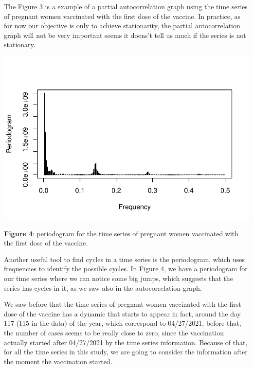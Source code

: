 \documentclass[
]{article}
\newenvironment{Shaded}{\begin{snugshade}}{\end{snugshade}}
\newcommand{\AttributeTok}[1]{\textcolor[rgb]{0.13,0.29,0.53}{#1}}
\newcommand{\FunctionTok}[1]{\textcolor[rgb]{0.13,0.29,0.53}{\textbf{#1}}}
\newcommand{\NormalTok}[1]{#1}
\newcommand{\SpecialCharTok}[1]{\textcolor[rgb]{0.81,0.36,0.00}{\textbf{#1}}}
\newcommand{\StringTok}[1]{\textcolor[rgb]{0.31,0.60,0.02}{#1}}
\renewenvironment{Shaded}{\begin{mdframed}[ backgroundcolor=shadecolor, linecolor = shadecolor, leftmargin=\dimexpr\leftmargin-2pt\relax, innerleftmargin=1.6pt, innertopmargin=5pt, skipabove=10pt,skipbelow=3pt ]}{\end{mdframed}}
\begin{document}
The Figure 3 is a example of a partial autocorrelation graph using the
time series of pregnant women vaccinated with the first dose of the
vaccine. In practice, as for now our objective is only to achieve
stationarity, the partial autocorrelation graph will not be very
important seems it doens't tell us much if the series is not stationary.

\begin{Shaded}
\end{Shaded}

\begin{center}\includegraphics[width=\linewidth]{IF_results_ENG_files/figure-latex/unnamed-chunk-4-1} \end{center}

\textbf{Figure 4}: periodogram for the time series of pregnant women
vaccinated with the first dose of the vaccine.

Another useful tool to find cycles in a time series is the periodogram,
which uses frequencies to identify the possible cycles. In Figure 4, we
have a periodogram for our time series where we can notice some big
jumps, which suggests that the series has cycles in it, as we saw also
in the autocorrelation graph.

We saw before that the time series of pregnant women vaccinated with the
first dose of the vaccine has a dynamic that starts to appear in fact,
around the day 117 (115 in the data) of the year, which correspond to
04/27/2021, before that, the number of cases seems to be really close to
zero, since the vaccination actually started after 04/27/2021 by the
time series information. Because of that, for all the time series in
this study, we are going to consider the information after the moment
the vaccination started.
\end{document}
